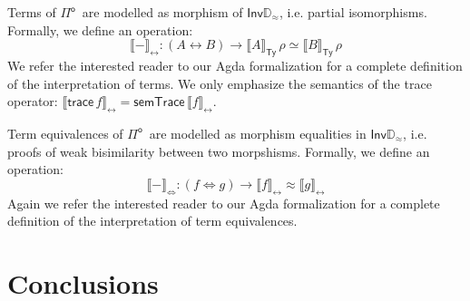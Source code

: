 \documentclass[runningheads,a4paper]{llncs}
\newcommand{\Pio}{\ensuremath{\mathsf{\Pi}^{\mathsf{o}}}}
\newcommand{\Inv}{\mathsf{Inv}}
\newcommand{\lr}{\longleftrightarrow}
\newcommand{\trace}{\ensuremath{\mathsf{trace}}}
\newcommand{\LR}{\iff}
\newcommand{\Dapprox}{\mathbb{D}_{\approx}}
\newcommand{\semTy}[1]{{\llbracket #1 \rrbracket}_\mathsf{Ty}}
\newcommand{\semTm}[1]{{\llbracket #1 \rrbracket}_{\lr}}
\newcommand{\semEq}[1]{{\llbracket #1 \rrbracket}_{\LR}}
\begin{document}
Terms of \Pio\ are modelled as morphism of $\Inv\Dapprox$,
i.e. partial isomorphisms. Formally, we define an operation:
\[
\semTm - : (A \lr B) \to \semTy A \, \rho \simeq \semTy B \, \rho
\]
We refer the interested reader to our Agda formalization for a
complete definition of the interpretation of terms. We only emphasize
the semantics of the trace operator: $\semTm {\trace\,f} =
\mathsf{semTrace}\,\semTm f$. 

Term equivalences of \Pio\ are modelled as morphism equalities in
$\Inv\Dapprox$, i.e. proofs of weak bisimilarity between two
morpshisms. Formally, we define an operation:
\[
\semEq - : (f \LR g) \to \semTm f \approx \semTm g
\]
Again we refer the interested reader to our Agda formalization for a
complete definition of the interpretation of term equivalences.


\section{Conclusions}


%
%
%
%
%
%


\end{document}
